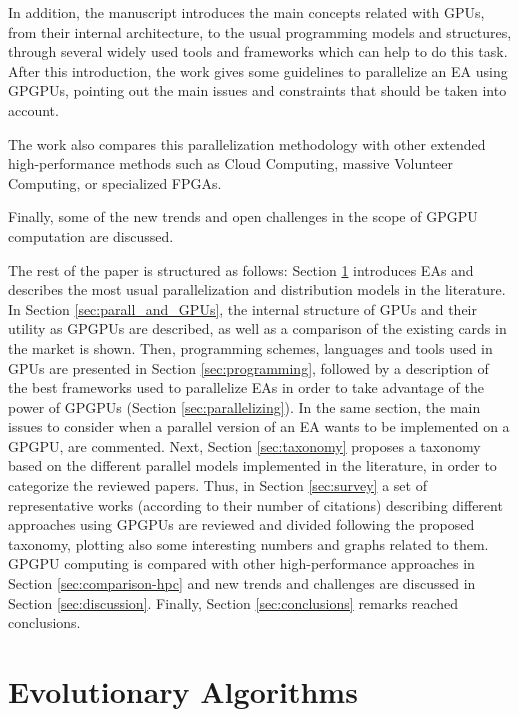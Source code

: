 \documentclass{article}
\begin{document}
In addition, the manuscript introduces the main concepts related with
GPUs, from their internal architecture, to the usual programming
models and structures, through several widely used tools and
frameworks which can help to do this task. After this introduction, the work gives some guidelines to parallelize an EA using GPGPUs, pointing out the main issues and constraints that should be taken into account.

The work also compares this parallelization methodology with other extended high-performance methods such as Cloud Computing, massive Volunteer Computing, or specialized FPGAs.

Finally, some of the new trends and open challenges in the scope of GPGPU computation are discussed.

The rest of the paper is structured as follows: Section \ref{sec:eas}
introduces EAs and describes the most usual parallelization and
distribution models in the literature.  In Section
\ref{sec:parall_and_GPUs}, the internal structure of GPUs and their
utility as GPGPUs are described, as well as a comparison of the
existing cards in the market is shown.  Then, programming schemes,
languages and tools used in GPUs are presented in Section
\ref{sec:programming}, followed by a description of the best
frameworks used to parallelize EAs in order to take advantage of the
power of GPGPUs (Section \ref{sec:parallelizing}). In the same
section, the main issues to consider when a parallel version of an EA
wants to be implemented on a GPGPU, are commented.  Next, Section
\ref{sec:taxonomy} proposes a taxonomy based on the different parallel
models implemented in the literature, in order to categorize the
reviewed papers. Thus, in Section \ref{sec:survey} a set of
representative works (according to their number of citations)
describing different approaches using GPGPUs are reviewed and divided
following the proposed taxonomy, plotting also some interesting
numbers and graphs related to them.  GPGPU computing is compared with
other high-performance approaches in Section \ref{sec:comparison-hpc}
and new trends and challenges are discussed in Section
\ref{sec:discussion}. Finally, Section \ref{sec:conclusions} remarks
reached conclusions.


\section{Evolutionary Algorithms}
\label{sec:eas}
\end{document}
